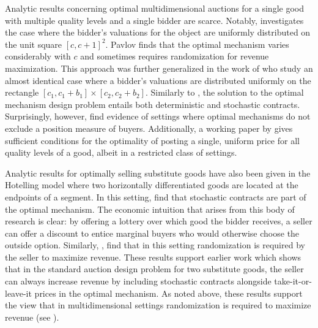 \documentclass{article}
\begin{document}
Analytic results concerning optimal multidimensional auctions for a single good with multiple quality levels and a single bidder are scarce. Notably, \autocite{pavlov2011optimal} investigates the case where the bidder's valuations for the object are uniformly distributed on the unit square $[c,c+1]^2$. Pavlov finds that the optimal mechanism varies considerably with $c$ and sometimes requires randomization for revenue maximization. This approach was further generalized in the work of \autocite{thirumulanathan2019unitdemand} who study an almost identical case where a bidder's valuations are distributed uniformly on the rectangle $[c_1,c_1+b_1]\times[c_2,c_2+b_2]$. Similarly to \autocite{pavlov2011optimal}, the solution to the optimal mechanism design problem entails both deterministic and stochastic contracts. Surprisingly, however, \autocite{thirumulanathan2019unitdemand} find evidence of settings where optimal mechanisms do not exclude a position measure of buyers. Additionally, a working paper by \autocite{haghpanah2014} gives sufficient conditions for the optimality of posting a single, uniform price for all quality levels of a good, albeit in a restricted class of settings.

Analytic results for optimally selling substitute goods have also been given in the Hotelling model \autocite{hotelling1929} where two horizontally differentiated goods are located at the endpoints of a segment. In this setting, \autocite{balestrieri2020} find that stochastic contracts are part of the optimal mechanism. The economic intuition that arises from this body of research is clear: by offering a lottery over which good the bidder receives, a seller can offer a discount to entice marginal buyers who would otherwise choose the outside option. Similarly, \autocite{loertscher2023}, find that in this setting randomization is required by the seller to maximize revenue. These results support earlier work \autocite{thanassoulis2004} which shows that in the standard auction design problem for two substitute goods, the seller can always increase revenue by including stochastic contracts alongside take-it-or-leave-it prices in the optimal mechanism. As noted above, these results support the view that in multidimensional settings randomization is required to maximize revenue (see \cite{daskalakis2015multi}). 
\end{document}
